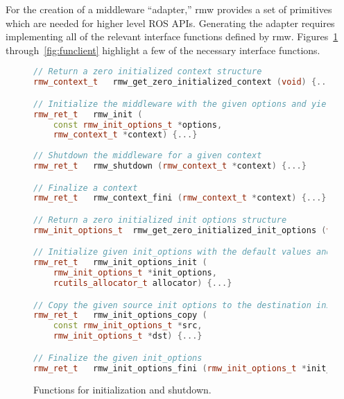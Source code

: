         For the creation of a middleware ``adapter,'' \textsf{rmw} provides a set of primitives which are needed for higher level \ac{ROS} \ac{API}s. Generating the adapter requires implementing all of the relevant interface functions defined by \textsf{rmw}. Figures~\ref{fig:funinit} through~\ref{fig:funclient} highlight a few of the necessary interface functions. 



        \begin{figure}[htbp]
            \begin{lstlisting}[language=C++]
// Return a zero initialized context structure
rmw_context_t 	rmw_get_zero_initialized_context (void) {...}

// Initialize the middleware with the given options and yield a context
rmw_ret_t 	rmw_init (
    const rmw_init_options_t *options, 
    rmw_context_t *context) {...}
    
// Shutdown the middleware for a given context
rmw_ret_t 	rmw_shutdown (rmw_context_t *context) {...}

// Finalize a context
rmw_ret_t 	rmw_context_fini (rmw_context_t *context) {...}

// Return a zero initialized init options structure
rmw_init_options_t 	rmw_get_zero_initialized_init_options (void) {...}

// Initialize given init_options with the default values and implementation specific values
rmw_ret_t 	rmw_init_options_init (
    rmw_init_options_t *init_options, 
    rcutils_allocator_t allocator) {...}

// Copy the given source init options to the destination init options
rmw_ret_t 	rmw_init_options_copy (
    const rmw_init_options_t *src, 
    rmw_init_options_t *dst) {...}

// Finalize the given init_options
rmw_ret_t 	rmw_init_options_fini (rmw_init_options_t *init_options) {...}\end{lstlisting}
            \caption{Functions for initialization and shutdown.}
            \label{fig:funinit}
        \end{figure}


